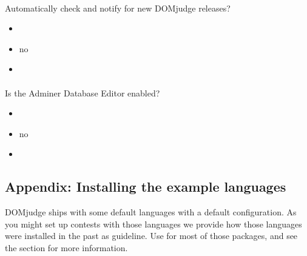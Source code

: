 \documentclass[a4paper,10pt,english,openany]{sphinxmanual}
\begin{document}
\paragraph{}
\label{\detokenize{configuration-reference:check-new-version}}
\sphinxAtStartPar
Automatically check and notify for new DOMjudge releases?
\begin{itemize}
\item {} 
\sphinxAtStartPar
{} 

\item {} 
\sphinxAtStartPar
{} no

\item {} 
\sphinxAtStartPar
{}

\begin{sphinxVerbatim}[commandchars=\\\{\}]
\end{sphinxVerbatim}

\end{itemize}


\paragraph{}
\label{\detokenize{configuration-reference:adminer-enabled}}
\sphinxAtStartPar
Is the Adminer Database Editor enabled?
\begin{itemize}
\item {} 
\sphinxAtStartPar
{} 

\item {} 
\sphinxAtStartPar
{} no

\item {} 
\sphinxAtStartPar
{} 

\end{itemize}

\sphinxstepscope


\subsection{Appendix: Installing the example languages}
\label{\detokenize{install-language:appendix-installing-the-example-languages}}\label{\detokenize{install-language::doc}}
\sphinxAtStartPar
DOMjudge ships with some default languages with a default configuration.
As you might set up contests with those languages we provide how those languages were
installed in the past as guideline. Use  for most of those packages, and see
the section {\hyperref[\detokenize{install-judgehost:make-chroot}]{}} for more information.
\end{document}
